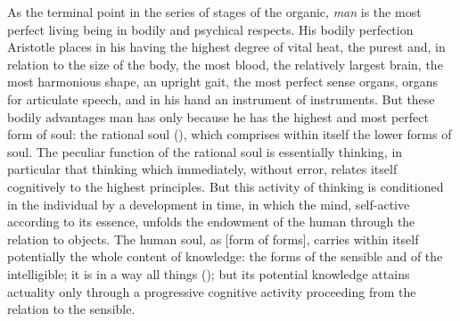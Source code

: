 As the terminal point in the series of stages of the organic, \emph{man} is the most perfect living being in bodily and psychical respects. His bodily perfection Aristotle places in his having the highest degree of vital heat, the purest and, in relation to the size of the body, the most blood, the relatively largest brain, the most harmonious shape, an upright gait, the most perfect sense organs, organs for articulate speech, and in his hand an instrument of instruments. But these bodily advantages man has only because he has the highest and most perfect form of soul: the rational soul (), which comprises within itself the lower forms of soul. The peculiar function of the rational soul is essentially thinking, in particular that thinking which immediately, without error, relates itself cognitively to the highest principles. But this activity of thinking is conditioned in the individual by a development in time, in which the mind, self-active according to its essence, unfolds the endowment of the human through the relation to objects. The human soul, as  [form of forms], carries within itself potentially the whole content of knowledge: the forms of the sensible and of the intelligible; it is in a way all things (); but its potential knowledge attains actuality only through a progressive cognitive activity proceeding from the relation to the sensible.

